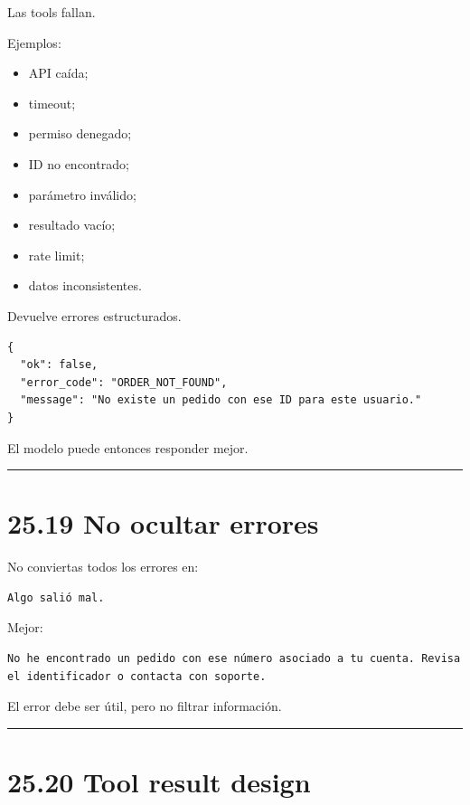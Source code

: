 Las tools fallan.

Ejemplos:

\begin{itemize}
\tightlist
\item
  API caída;
\item
  timeout;
\item
  permiso denegado;
\item
  ID no encontrado;
\item
  parámetro inválido;
\item
  resultado vacío;
\item
  rate limit;
\item
  datos inconsistentes.
\end{itemize}

Devuelve errores estructurados.

\begin{lstlisting}
{
  "ok": false,
  "error_code": "ORDER_NOT_FOUND",
  "message": "No existe un pedido con ese ID para este usuario."
}
\end{lstlisting}

El modelo puede entonces responder mejor.

\begin{center}\rule{0.5\linewidth}{0.5pt}\end{center}

\section{25.19 No ocultar errores}\label{no-ocultar-errores}

No conviertas todos los errores en:

\begin{lstlisting}
Algo salió mal.
\end{lstlisting}

Mejor:

\begin{lstlisting}
No he encontrado un pedido con ese número asociado a tu cuenta. Revisa el identificador o contacta con soporte.
\end{lstlisting}

El error debe ser útil, pero no filtrar información.

\begin{center}\rule{0.5\linewidth}{0.5pt}\end{center}

\section{25.20 Tool result design}\label{tool-result-design}

